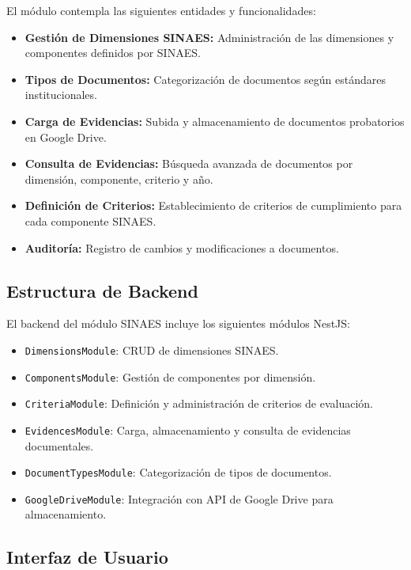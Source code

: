 El módulo contempla las siguientes entidades y funcionalidades:

\begin{itemize}
    \item \textbf{Gestión de Dimensiones SINAES:} Administración de las dimensiones y componentes definidos por SINAES.
    \item \textbf{Tipos de Documentos:} Categorización de documentos según estándares institucionales.
    \item \textbf{Carga de Evidencias:} Subida y almacenamiento de documentos probatorios en Google Drive.
    \item \textbf{Consulta de Evidencias:} Búsqueda avanzada de documentos por dimensión, componente, criterio y año.
    \item \textbf{Definición de Criterios:} Establecimiento de criterios de cumplimiento para cada componente SINAES.
    \item \textbf{Auditoría:} Registro de cambios y modificaciones a documentos.
\end{itemize}

\subsection{Estructura de Backend}

El backend del módulo SINAES incluye los siguientes módulos NestJS:

\begin{itemize}
    \item \texttt{DimensionsModule}: CRUD de dimensiones SINAES.
    \item \texttt{ComponentsModule}: Gestión de componentes por dimensión.
    \item \texttt{CriteriaModule}: Definición y administración de criterios de evaluación.
    \item \texttt{EvidencesModule}: Carga, almacenamiento y consulta de evidencias documentales.
    \item \texttt{DocumentTypesModule}: Categorización de tipos de documentos.
    \item \texttt{GoogleDriveModule}: Integración con API de Google Drive para almacenamiento.
\end{itemize}

\subsection{Interfaz de Usuario}

